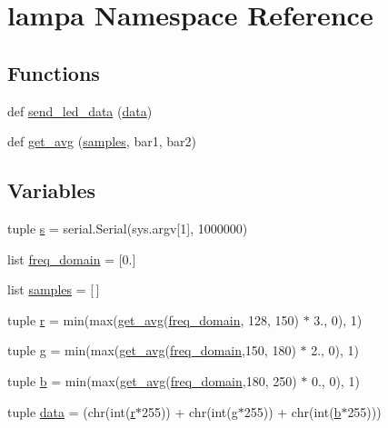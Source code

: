 \hypertarget{namespacelampa}{}\section{lampa Namespace Reference}
\label{namespacelampa}
\subsection*{Functions}
\begin{DoxyCompactItemize}
\item 
def \hyperlink{namespacelampa_a0ab6e60b6413b1fbd992421bdc2ef373}{send\+\_\+led\+\_\+data} (\hyperlink{namespacelampa_a4c66f46ba5e9629783f0a6853fca9fe3}{data})
\item 
def \hyperlink{namespacelampa_a655d6832e131c14c5df3b9987311d5f9}{get\+\_\+avg} (\hyperlink{namespacelampa_a1a7945b56fddcb39fd7cebfcbde049d4}{samples}, bar1, bar2)
\end{DoxyCompactItemize}
\subsection*{Variables}
\begin{DoxyCompactItemize}
\item 
tuple \hyperlink{namespacelampa_af6cd9afef9d5497a7d3f29f01c0b35fc}{s} = serial.\+Serial(sys.\+argv\mbox{[}1\mbox{]}, 1000000)
\item 
list \hyperlink{namespacelampa_a0023f9bb1a443d88bfc1ceae37d86a2d}{freq\+\_\+domain} = \mbox{[}0.\mbox{]}
\item 
list \hyperlink{namespacelampa_a1a7945b56fddcb39fd7cebfcbde049d4}{samples} = \mbox{[}$\,$\mbox{]}
\item 
tuple \hyperlink{namespacelampa_a33feca73448b5b010b10a585af4dc6ba}{r} = min(max(\hyperlink{namespacelampa_a655d6832e131c14c5df3b9987311d5f9}{get\+\_\+avg}(\hyperlink{namespacelampa_a0023f9bb1a443d88bfc1ceae37d86a2d}{freq\+\_\+domain}, 128, 150) $\ast$ 3., 0), 1)
\item 
tuple \hyperlink{namespacelampa_aaba00d880a609d8039d179c4501f6efb}{g} = min(max(\hyperlink{namespacelampa_a655d6832e131c14c5df3b9987311d5f9}{get\+\_\+avg}(\hyperlink{namespacelampa_a0023f9bb1a443d88bfc1ceae37d86a2d}{freq\+\_\+domain},150, 180) $\ast$ 2., 0), 1)
\item 
tuple \hyperlink{namespacelampa_a73e39e0290c321fa4939f4b0c4efa9a3}{b} = min(max(\hyperlink{namespacelampa_a655d6832e131c14c5df3b9987311d5f9}{get\+\_\+avg}(\hyperlink{namespacelampa_a0023f9bb1a443d88bfc1ceae37d86a2d}{freq\+\_\+domain},180, 250) $\ast$ 0., 0), 1)
\item 
tuple \hyperlink{namespacelampa_a4c66f46ba5e9629783f0a6853fca9fe3}{data} = (chr(int(\hyperlink{namespacelampa_a33feca73448b5b010b10a585af4dc6ba}{r}$\ast$255)) + chr(int(\hyperlink{namespacelampa_aaba00d880a609d8039d179c4501f6efb}{g}$\ast$255)) + chr(int(\hyperlink{namespacelampa_a73e39e0290c321fa4939f4b0c4efa9a3}{b}$\ast$255)))
\end{DoxyCompactItemize}


